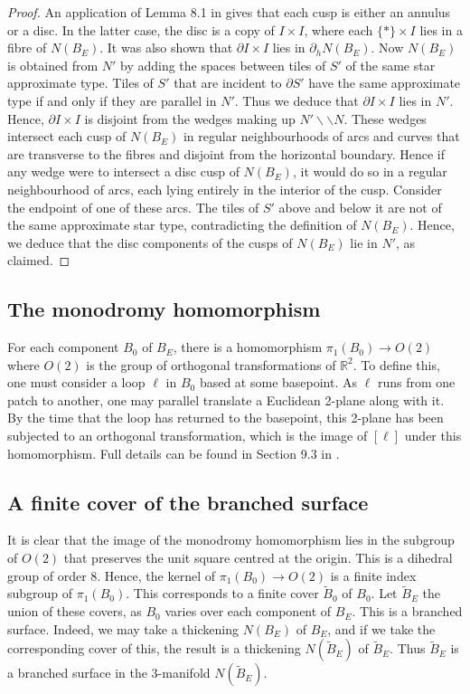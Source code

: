 \documentclass[oneside]{amsart}
\numberwithin{equation}{section}
\theoremstyle{plain}
\theoremstyle{definition}
\newcommand{\cut}{\backslash\backslash}
\begin{document}
\begin{proof}
An application of Lemma 8.1 in \cite{Lackenby:PolyUnknot} gives that each cusp is either an annulus or a disc. In the latter case, the disc is a copy of $I \times I$, where each $\{ \ast \} \times I$ lies in a fibre of $N(B_E)$. It was also shown that $\partial I \times I$ lies in $\partial_h N(B_E)$. Now $N(B_E)$ is obtained from $N'$ by adding the spaces between tiles of $S'$ of the same star approximate type. Tiles of $S'$ that are incident to $\partial S'$ have the same approximate type if and only if they are parallel in $N'$. Thus we deduce that $\partial I \times I$ lies in $N'$. Hence, $\partial I \times I$ is disjoint from the wedges making up $N' \cut N$. These wedges intersect each cusp of $N(B_E)$ in regular neighbourhoods of arcs and curves that are transverse to the fibres and disjoint from the horizontal boundary. Hence if any wedge were to intersect a disc cusp of $N(B_E)$, it would do so in a regular neighbourhood of arcs, each lying entirely in the interior of the cusp. Consider the endpoint of one of these arcs. The tiles of $S'$ above and below it are not of the same approximate star type, contradicting the definition of $N(B_E)$. Hence, we deduce that the disc components of the cusps of $N(B_E)$ lie in $N'$, as claimed.
\end{proof}

\subsection{The monodromy homomorphism}
\label{Subsec:Monodromy}

For each component $B_0$ of $B_E$, there is a homomorphism $\pi_1(B_0) \rightarrow O(2)$ where $O(2)$
is the group of orthogonal transformations of $\mathbb{R}^2$. To define this, one
must consider a loop $\ell$ in $B_0$ based at some basepoint. As $\ell$ runs from one
patch to another, one may parallel translate a Euclidean 2-plane along with it.
By the time that the loop has returned to the basepoint, this 2-plane has been
subjected to an orthogonal transformation, which is the image of $[\ell]$ under this
homomorphism. Full details can be found in Section 9.3 in \cite{Lackenby:PolyUnknot}.

\subsection{A finite cover of the branched surface}

It is clear that the image of the monodromy homomorphism lies in the subgroup
of $O(2)$ that preserves the unit square centred at the origin. This is a dihedral group of order $8$. Hence, the kernel of
$\pi_1(B_0) \rightarrow O(2)$ is a finite index subgroup of $\pi_1(B_0)$. This corresponds
to a finite cover $\tilde B_0$ of $B_0$. Let $\tilde B_E$ the union of these covers, as
$B_0$ varies over each component of $B_E$. This is a branched surface. Indeed, we may take a thickening $N(B_E)$ of $B_E$,
and if we take the corresponding cover of this, the result is a thickening $N(\tilde B_E)$
of $\tilde B_E$. Thus $\tilde B_E$ is a branched surface in the 3-manifold $N(\tilde B_E)$.
\end{document}
